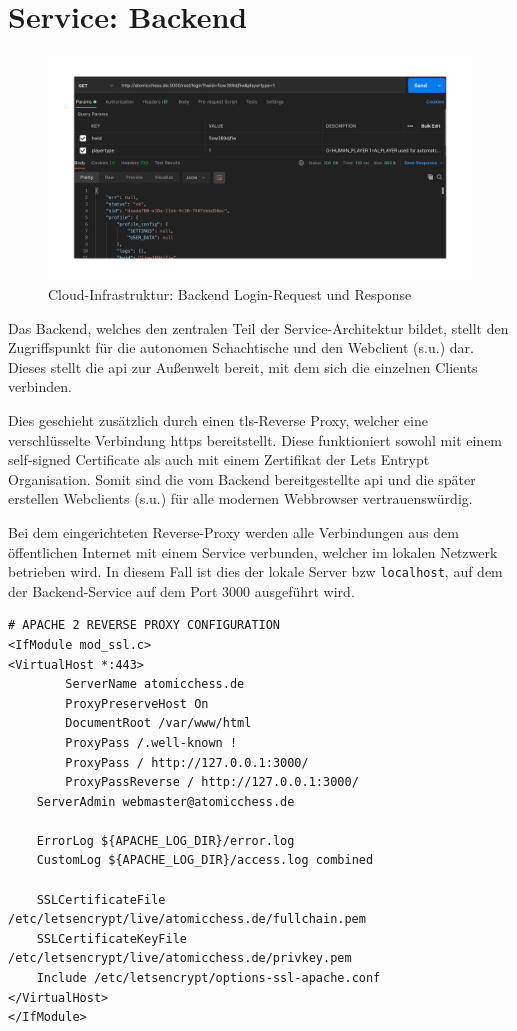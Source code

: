 \hypertarget{service-backend}{%
\section{Service: Backend}\label{service-backend}}

\begin{figure}
\centering
\includegraphics{images/ATC_request_example.png}
\caption{Cloud-Infrastruktur: Backend Login-Request und Response
\label{ATC_request_example}}
\end{figure}

Das Backend, welches den zentralen Teil der Service-Architektur bildet,
stellt den Zugriffspunkt für die autonomen Schachtische und den
Webclient (s.u.) dar. Dieses stellt die \gls{api} zur Außenwelt bereit,
mit dem sich die einzelnen Clients verbinden.

Dies geschieht zusätzlich durch einen \gls{tls}-Reverse Proxy, welcher
eine verschlüsselte Verbindung \gls{https} bereitstellt. Diese
funktioniert sowohl mit einem self-signed Certificate als auch mit einem
Zertifikat der Lets Entrypt Organisation\cite{letsencrpyt}. Somit
sind die vom Backend bereitgestellte \gls{api} und die später erstellen
Webclients (s.u.) für alle modernen Webbrowser vertrauenswürdig.

Bei dem eingerichteten Reverse-Proxy werden alle Verbindungen aus dem
öffentlichen Internet mit einem Service verbunden, welcher im lokalen
Netzwerk betrieben wird. In diesem Fall ist dies der lokale Server bzw
\passthrough{\lstinline!localhost!}, auf dem der Backend-Service auf dem
Port 3000 ausgeführt wird.

\begin{lstlisting}
# APACHE 2 REVERSE PROXY CONFIGURATION
<IfModule mod_ssl.c>
<VirtualHost *:443>
        ServerName atomicchess.de
        ProxyPreserveHost On 
        DocumentRoot /var/www/html
        ProxyPass /.well-known !
        ProxyPass / http://127.0.0.1:3000/
        ProxyPassReverse / http://127.0.0.1:3000/
    ServerAdmin webmaster@atomicchess.de

    ErrorLog ${APACHE_LOG_DIR}/error.log
    CustomLog ${APACHE_LOG_DIR}/access.log combined

    SSLCertificateFile /etc/letsencrypt/live/atomicchess.de/fullchain.pem
    SSLCertificateKeyFile /etc/letsencrypt/live/atomicchess.de/privkey.pem
    Include /etc/letsencrypt/options-ssl-apache.conf
</VirtualHost>
</IfModule>
\end{lstlisting}

